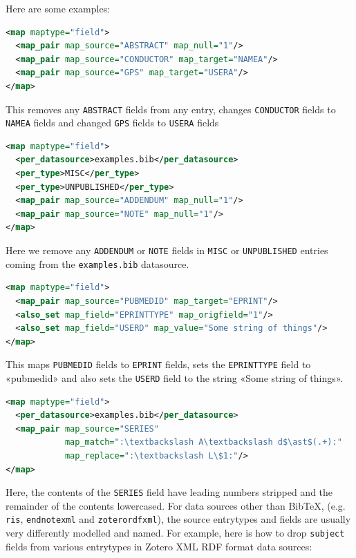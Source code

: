 \documentclass{ltxdockit}
\begin{document}
\noindent Here are some examples:


\begin{lstlisting}[language=xml,escapechar=:,mathescape=true]
<map maptype="field">
  <map_pair map_source="ABSTRACT" map_null="1"/>
  <map_pair map_source="CONDUCTOR" map_target="NAMEA"/>
  <map_pair map_source="GPS" map_target="USERA"/>
</map>
\end{lstlisting}

\noindent This removes any \verb+ABSTRACT+ fields from any entry, changes
\verb+CONDUCTOR+ fields to \verb+NAMEA+ fields and changed \verb+GPS+
fields to \verb+USERA+ fields

\begin{lstlisting}[language=xml,escapechar=:,mathescape=true]
<map maptype="field">
  <per_datasource>examples.bib</per_datasource>
  <per_type>MISC</per_type>
  <per_type>UNPUBLISHED</per_type>
  <map_pair map_source="ADDENDUM" map_null="1"/>
  <map_pair map_source="NOTE" map_null="1"/>
</map>
\end{lstlisting}

\noindent Here we remove any \verb+ADDENDUM+ or \verb+NOTE+ fields in
\verb+MISC+ or \verb+UNPUBLISHED+ entries coming from the
\verb+examples.bib+ datasource.

\begin{lstlisting}[language=xml,escapechar=:,mathescape=true]
<map maptype="field">
  <map_pair map_source="PUBMEDID" map_target="EPRINT"/>
  <also_set map_field="EPRINTTYPE" map_origfield="1"/>
  <also_set map_field="USERD" map_value="Some string of things"/>
</map>
\end{lstlisting}

\noindent This maps \verb+PUBMEDID+ fields to \verb+EPRINT+ fields, sets
the \verb+EPRINTTYPE+ field to «pubmedid» and also sets the \verb+USERD+
field to the string «Some string of things».

\begin{lstlisting}[language=xml,escapechar=:,mathescape=true]
<map maptype="field">
  <per_datasource>examples.bib</per_datasource>
  <map_pair map_source="SERIES"
            map_match=":\textbackslash A\textbackslash d$\ast$(.+):"
            map_replace=":\textbackslash L\$1:"/>
</map>
\end{lstlisting}

\noindent Here, the contents of the \verb+SERIES+
field have leading numbers stripped and the remainder of the contents
lowercased.
\bigskip
{}
For data sources other than Bib\TeX, (e.g. \verb+ris+,
\verb+endnotexml+ and \verb+zoterordfxml+), the source entrytypes and
fields are usually very differently modelled and named. For example, here
is how to drop \verb+subject+ fields from various entrytypes in Zotero XML
RDF format data sources:
\end{document}
